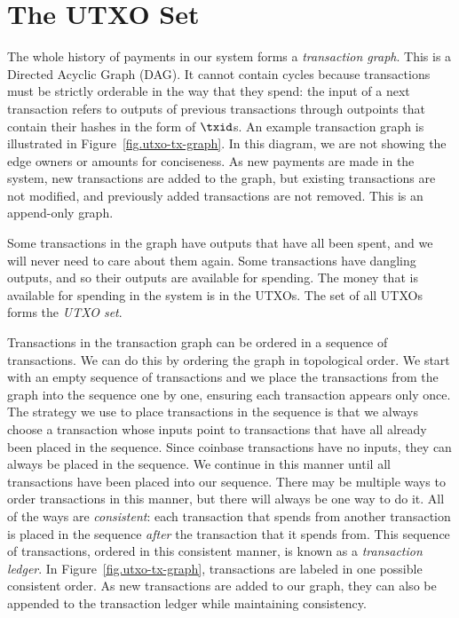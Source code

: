 \section{The UTXO Set}

The whole history of payments in our system forms a \emph{transaction graph}.
This is a Directed Acyclic Graph (DAG). It cannot contain cycles because transactions must be
strictly orderable in the way that they spend: the input of a next transaction refers to
outputs of previous transactions through outpoints that contain their hashes in the form of $\txid$s.
An example transaction graph is illustrated in Figure~\ref{fig.utxo-tx-graph}. In this diagram,
we are not showing the edge owners or amounts for conciseness. As new payments are made in the system,
new transactions are added to the graph, but existing transactions are not modified, and previously
added transactions are not removed. This is an append-only graph.

Some transactions in the graph have outputs that have all been spent, and we will never need to care
about them again. Some transactions have dangling outputs, and so their outputs are available for
spending. The money that is available for spending in the system is in the UTXOs. The set of all UTXOs
forms the \emph{UTXO set}.

Transactions in the transaction graph can be ordered in a sequence of transactions. We can do this
by ordering the graph in topological order. We start with an empty sequence of transactions and we
place the transactions from the graph into the sequence one by one, ensuring each transaction appears
only once. The strategy we use to place transactions in the sequence is that we always choose a transaction
whose inputs point to transactions that have all already
been placed in the sequence. Since coinbase transactions have no inputs, they can always be placed in the sequence.
We continue
in this manner until all transactions have been placed into our sequence. There may be multiple
ways to order transactions in this manner, but there will always be one way to do it. All of the ways
are \emph{consistent}: each transaction
that spends from another transaction is placed in the sequence \emph{after} the transaction that it spends
from. This sequence of transactions, ordered in this consistent manner, is known as a
\emph{transaction ledger}. In Figure~\ref{fig.utxo-tx-graph}, transactions are labeled
in one possible consistent order. As new transactions are added to our graph, they can also be appended
to the transaction ledger while maintaining consistency.


